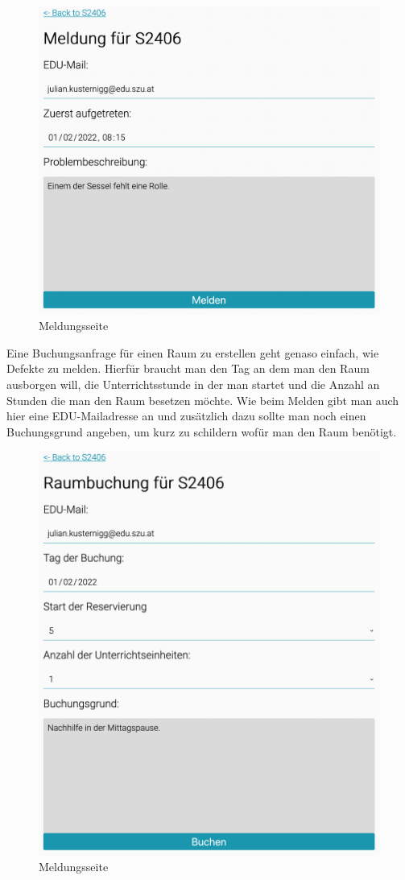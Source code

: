 \begin{figure}[H]
    \centering
    \includegraphics[width=120mm]{media/WebComponents/Meldungsseite_light.png}
    \caption{Meldungsseite}
\end{figure}

Eine Buchungsanfrage für einen Raum zu erstellen geht genaso einfach, wie Defekte zu melden. Hierfür braucht man den Tag an dem man den Raum ausborgen will, die Unterrichtsstunde in der man startet und die Anzahl an Stunden die man den Raum besetzen möchte. Wie beim Melden gibt man auch hier eine EDU-Mailadresse an und zusätzlich dazu sollte man noch einen Buchungsgrund angeben, um kurz zu schildern wofür man den Raum benötigt.

\begin{figure}[H]
    \centering
    \includegraphics[width=120mm]{media/WebComponents/Buchungsseite_light.png}
    \caption{Meldungsseite}
\end{figure}



